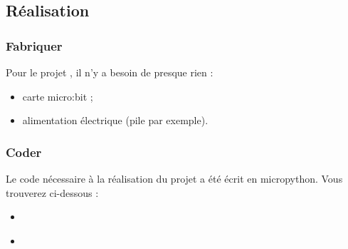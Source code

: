 \documentclass[letterpaper,10pt,french]{sphinxmanual}
\begin{document}
\subsection{Réalisation}
\label{\detokenize{projets/temperature:realisation}}

\subsubsection{Fabriquer}
\label{\detokenize{projets/temperature-fabriquer:projettempfabriquer}}\label{\detokenize{projets/temperature-fabriquer::doc}}\label{\detokenize{projets/temperature-fabriquer:fabriquer}}
Pour le projet , il n’y a besoin de presque rien :
\begin{itemize}
\item {} 
carte micro:bit ;

\item {} 
alimentation électrique (pile par exemple).

\end{itemize}
\label{\detokenize{projets/temperature-coder:projettempcoder}}
\ignorespaces 

\subsubsection{Coder}
\label{\detokenize{projets/temperature-coder:index-0}}\label{\detokenize{projets/temperature-coder:coder}}\label{\detokenize{projets/temperature-coder::doc}}
Le code nécessaire à la réalisation du projet  a été
écrit en micropython. Vous trouverez ci-dessous :
\begin{itemize}
\item {} 
{\hyperref[\detokenize{projets/temperature-coder:le-code-etape-par-etape}]{}}

\item {} 
{\hyperref[\detokenize{projets/temperature-coder:le-code-final}]{}}

\end{itemize}
\end{document}
